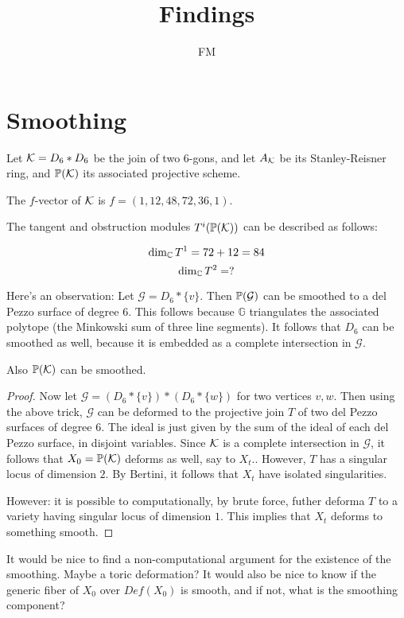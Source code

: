 \documentclass[11pt, english]{article}
\title{Findings}
\author{FM}
\date{}
\begin{document}
\maketitle
\section{Smoothing}

Let $\mathcal K=D_6 \ast D_6$ be the join of two $6$-gons, and let $A_\mathcal K$ be its Stanley-Reisner ring, and $\mathbb{P}(\mathcal K)$ its associated projective scheme. 

\begin{lemma}
The $f$-vector of $\mathcal K$ is $f=(1,12,48,72,36,1)$. 
\end{lemma}

The tangent and obstruction modules $T^i(\mathbb{P}(\mathcal K))$ can be described as follows: 

\begin{prop}
\[
\dim_{\mathbb{C}} T^1 = 72+12 = 84
\]
\[
\dim_{\mathbb{C}} T^2 = ?
\]
\end{prop}

Here's an observation: Let $\mathcal G = D_6 \ast \{ v \}$. Then $\mathbb{P}(\mathcal G)$ can be smoothed to a del Pezzo surface of degree $6$. This follows because $\mathbb G$ triangulates the associated polytope (the Minkowski sum of three line segments). It follows that $D_6$ can be smoothed as well, because it is embedded as a complete intersection in $\mathcal G$.

\begin{prop}
Also $\mathbb{P}(\mathcal K)$ can be smoothed.
\end{prop}
\begin{proof}
Now let $\mathcal G=(D_6 \ast \{v \}) \ast (D_6 \ast \{w \})$ for two vertices $v,w$. Then using the above trick, $\mathcal G$ can be deformed to the projective join $T$ of two del Pezzo surfaces of degree $6$. The ideal is just given by the sum of the ideal of each del Pezzo surface, in disjoint variables. Since $\mathcal K$ is a complete intersection in $\mathcal G$, it follows that $X_0=\mathbb{P}(\mathcal K)$ deforms as well, say to $X_t$.. However, $T$ has a singular locus of dimension $2$. By Bertini, it follows that $X_t$ have isolated singularities.

However: it is possible to computationally, by brute force, futher deforma $T$ to a variety having singular locus of dimension $1$. This implies that $X_t$ deforms to something smooth.
\end{proof}

It would be nice to find a non-computational argument for the existence of the smoothing. Maybe a toric deformation? It would also be nice to know if the generic fiber of $X_0$ over $Def(X_0)$ is smooth, and if not, what is the smoothing component? 
\end{document}
